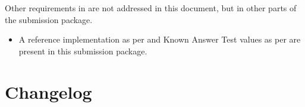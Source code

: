  Other requirements in \cite{NIST} are not addressed in this document, but in other parts of the submission package.
 \begin{itemize}
 \item
 A reference implementation as per \cite[Section 2.C.1]{NIST} and Known Answer Test values as per \cite[Section 2.B.2]{NIST} are present in this submission package.
 \end{itemize}

\section{Changelog}

